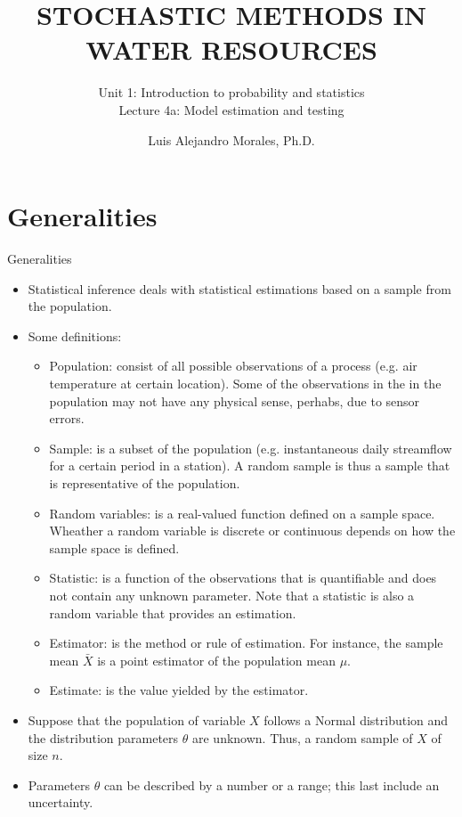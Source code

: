 \documentclass[8pt]{beamer}
\title{STOCHASTIC METHODS IN WATER RESOURCES}
\subtitle{Unit 1: Introduction to probability and statistics \\ Lecture 4a: Model estimation and testing}
\author{Luis Alejandro Morales, Ph.D.}
\institute{Universidad Nacional de Colombia \\ Department of Civil and Agriculture Engineering} %
\renewcommand{\emph}[1]{\textcolor{myorange}{#1}}
\begin{document}
\begin{frame}
    \titlepage
\end{frame}

\section{Generalities}
\begin{frame}{Generalities}
    \begin{itemize}
        \item Statistical inference deals with  statistical estimations based on a \emph{sample} from the \emph{population}.
        \item Some definitions:
            \begin{itemize}
                \item \alert{Population}: consist of all possible observations of a process (e.g. air temperature at certain location). Some of the observations in the in the population may not have any physical sense, perhabs, due to sensor errors. 
                \item \alert{Sample}: is a subset of the population (e.g. instantaneous daily streamflow for a certain period in a station). A \emph{random sample} is thus a sample that is representative of the population.
                \item \alert{Random variables}: is a \emph{real-valued function} defined on a \emph{sample space}. Wheather a random variable is \emph{discrete} or \emph{continuous} depends on how the sample space is defined. 
                \item \alert{Statistic}: is a function of the observations that is quantifiable and does not contain any unknown parameter. Note that a \emph{statistic} is also a random variable that provides an \emph{estimation}.
                \item \alert{Estimator}: is the method or rule of estimation. For instance, the \emph{sample mean} $\bar{X}$ is a point estimator of the \emph{population mean} $\mu$. 
                \item \alert{Estimate}: is the value yielded by the estimator. 
                 \end{itemize}
             \item Suppose that the population of variable $X$ follows a \emph{Normal distribution} and the distribution parameters $\theta$ are unknown. Thus, a random sample of $X$ of size $n$.
             \item Parameters $\theta$ can be described by a number or a range; this last include an uncertainty. 
    \end{itemize}
\end{frame}
\end{document}
